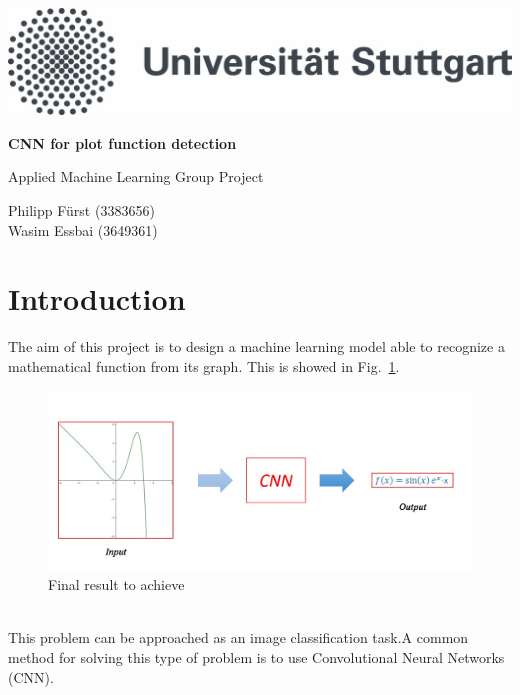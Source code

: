 \documentclass[11pt,a4paper]{scrartcl}
\newcommand{\Fig}[0]{Fig.}
\begin{document}
	\lstset{language=tex}
	
	\begin{titlepage}
		 \center
		 \includegraphics[scale=0.2]{ImageFiles/unistuttgart_logo_de} 
		 \vspace*{2cm} 
		
		\begin{center} \large 
		     
			 \vspace*{2cm}
			 {\huge \textbf{CNN for plot function detection}}
			 \vspace*{2.5cm}
			
			 Applied Machine Learning Group Project
			 \vspace*{2.5cm}
			
			 Philipp Fürst (3383656)\\
			 Wasim Essbai (3649361)
			 \vspace*{1cm}
		\end{center}
	\end{titlepage}

	\tableofcontents
	\listoffigures
	\listoftables
	\pagebreak
	
  	\pagestyle{plain}
  
	\section{Introduction}
	The aim of this project is to design a machine learning model able to recognize a mathematical function from its graph. This is showed in \Fig~\ref{fig:GeneralIdea}.
	\begin{figure}[h!]
		\centering
		\includegraphics[width=0.7\linewidth]{./ImageFiles/general_idea}
		\caption{Final result to achieve}
		\label{fig:GeneralIdea}
	\end{figure}\\This problem can be approached as an image classification task.A common method for solving this type of problem is to use Convolutional Neural Networks (CNN).
\end{document}
